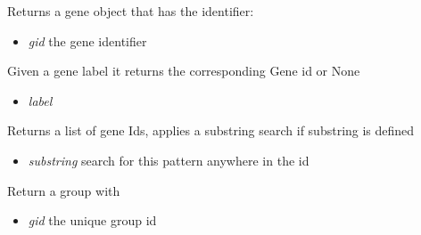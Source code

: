 \documentclass[a4paper,11pt,english]{sphinxmanual}
\begin{document}
\begin{fulllineitems}
\begin{fulllineitems}
\label{modules_doc:cbmpy.CBModel.Model.getGene}
Returns a gene object that has the identifier:
\begin{itemize}
\item {} 
\emph{gid} the gene identifier

\end{itemize}

\end{fulllineitems}


\begin{fulllineitems}
\label{modules_doc:cbmpy.CBModel.Model.getGeneIdFromLabel}
Given a gene label it returns the corresponding Gene id or None
\begin{itemize}
\item {} 
\emph{label}

\end{itemize}

\end{fulllineitems}


\begin{fulllineitems}
\label{modules_doc:cbmpy.CBModel.Model.getGeneIds}
Returns a list of gene Ids, applies a substring search if substring is defined
\begin{itemize}
\item {} 
\emph{substring} search for this pattern anywhere in the id

\end{itemize}

\end{fulllineitems}


\begin{fulllineitems}
\label{modules_doc:cbmpy.CBModel.Model.getGroup}
Return a group with
\begin{itemize}
\item {} 
\emph{gid} the unique group id

\end{itemize}


\end{fulllineitems}
\end{fulllineitems}
\end{document}

